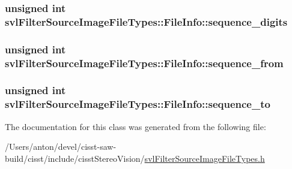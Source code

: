 \subsubsection[{sequence\+\_\+digits}]{\setlength{\rightskip}{0pt plus 5cm}unsigned int svl\+Filter\+Source\+Image\+File\+Types\+::\+File\+Info\+::sequence\+\_\+digits}\label{classsvl_filter_source_image_file_types_1_1_file_info_a00b6e0e6685952d16d283d344e39f53f}
\hypertarget{classsvl_filter_source_image_file_types_1_1_file_info_af7889fa40df40676dcb7ac7b4e2780ab}{}
\subsubsection[{sequence\+\_\+from}]{\setlength{\rightskip}{0pt plus 5cm}unsigned int svl\+Filter\+Source\+Image\+File\+Types\+::\+File\+Info\+::sequence\+\_\+from}\label{classsvl_filter_source_image_file_types_1_1_file_info_af7889fa40df40676dcb7ac7b4e2780ab}
\hypertarget{classsvl_filter_source_image_file_types_1_1_file_info_a6a3bbf38978a7fe690c9d3380208a30b}{}
\subsubsection[{sequence\+\_\+to}]{\setlength{\rightskip}{0pt plus 5cm}unsigned int svl\+Filter\+Source\+Image\+File\+Types\+::\+File\+Info\+::sequence\+\_\+to}\label{classsvl_filter_source_image_file_types_1_1_file_info_a6a3bbf38978a7fe690c9d3380208a30b}


The documentation for this class was generated from the following file\+:\begin{DoxyCompactItemize}
\item 
/\+Users/anton/devel/cisst-\/saw-\/build/cisst/include/cisst\+Stereo\+Vision/\hyperlink{svl_filter_source_image_file_types_8h}{svl\+Filter\+Source\+Image\+File\+Types.\+h}\end{DoxyCompactItemize}
